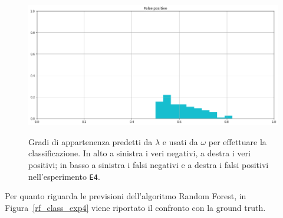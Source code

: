 \documentclass[12pt]{report}
\theoremstyle{definition}
\begin{document}
\begin{figure}
\begin{minipage}{0.48\textwidth}
   \end{minipage}
   \begin{minipage}{0.48\textwidth}
     \includegraphics[width=\linewidth]{images/experiment_uniform_sovrapposti/fp.png}\label{fp_us}
   \end{minipage}
   \caption{Gradi di appartenenza predetti da $\lambda$ e usati da $\omega$ per effettuare la classificazione. In alto a sinistra i veri negativi, a destra i veri positivi; in basso a sinistra i falsi negativi e a destra i falsi positivi nell'esperimento \texttt{E4}.}
   \label{4cases_exp4}
\end{figure}
Per quanto riguarda le previsioni dell'algoritmo Random Forest, in Figura~\ref{rf_class_exp4} viene riportato il confronto con la ground truth.
\end{document}
